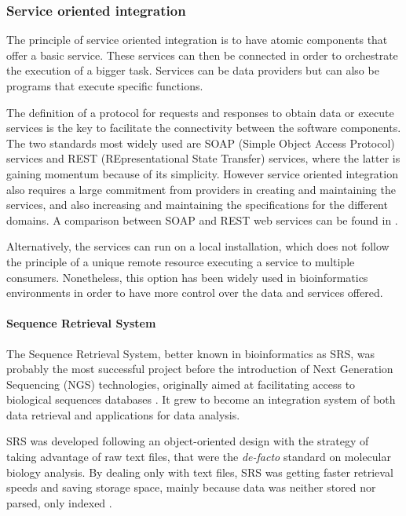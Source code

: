 \subsubsection{Service oriented integration} 
The principle of service oriented integration is to have atomic components that offer a basic service. These services can then be connected in order to orchestrate the execution of a bigger task. Services can be data providers but can also be programs that execute specific functions.

The definition of a protocol for requests and responses to obtain data or execute services is the key to facilitate the connectivity between the software components. The two standards most widely used are SOAP (Simple Object Access Protocol) services and REST (REpresentational State Transfer) services, where the latter is gaining momentum because of its simplicity. However service oriented integration also requires a large commitment from providers in creating and maintaining the services, and also increasing and maintaining the specifications for the different domains. A comparison between SOAP and REST web services can be found in \cite{PAU2008}.

Alternatively, the services can run on a local installation, which does not follow the principle of a unique remote resource executing a service to multiple consumers. Nonetheless, this option has been widely used in bioinformatics environments in order to have more control over the data and services offered.

\paragraph{Sequence Retrieval System}

The Sequence Retrieval System, better known in bioinformatics as SRS, was probably the most successful project before the introduction of Next Generation Sequencing (NGS) technologies, originally aimed at facilitating access to biological sequences databases \cite{ETZ1996}. It grew to become an integration system of both data retrieval and applications for data analysis.

SRS was developed following an object-oriented design with the strategy of taking advantage of raw text files, that were the \emph{de-facto} standard on molecular biology analysis. By dealing only with text files, SRS was getting faster retrieval speeds and saving storage space, mainly because data was neither stored nor parsed, only indexed \cite{ZDO2002}.

